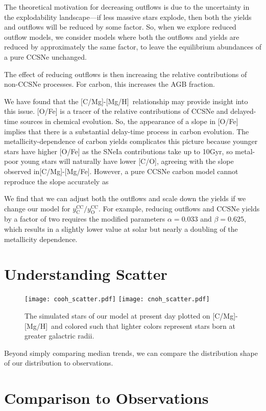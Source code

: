 \documentclass[12pt,oneside]{report}
\newcommand{\caah}{[C/Mg]-[Mg/H]}
\newcommand{\caafe}{[C/Mg]-[Mg/Fe]}
\begin{document}
The theoretical motivation for decreasing outflows is due to the uncertainty in the explodability landscape---if less massive stars explode, then both the yields and outflows will be reduced by some factor. So, when we explore reduced outflow models, we consider models where both the outflows and yields are reduced by approximately the same factor, to leave the equilibrium abundances of a pure CCSNe unchanged. 

The effect of reducing outflows is then increasing the relative contributions of non-CCSNe processes. For carbon, this increases the AGB fraction.

We have found that the \caah~relationship may provide insight into this issue. [O/Fe] is a tracer of the relative contributions of CCSNe and delayed-time sources in chemical evolution. So, the appearance of a slope in [O/Fe] implies that there is a substantial delay-time process in carbon evolution. 
The metallicity-dependence of carbon yields complicates this picture because
younger stars have higher [O/Fe] as the SNeIa contributions take up to 10Gyr,
so metal-poor young stars will naturally have lower [C/O], agreeing with the
slope observed in\caafe. However, a pure CCSNe carbon model cannot reproduce the slope accurately as  


We find that we can adjust both the outflows and scale down the yields if we change our model for $y_\text{C}^\text{CC}/y_\text{O}^\text{CC}$. For example, reducing outflows and CCSNe yields by a factor of two requires the modified parameters
$\alpha = 0.033$ and $\beta = 0.625$, which results in a slightly lower value at solar but nearly a doubling of the metallicity dependence.

\section{Understanding Scatter}

\begin{figure}
    \texttt{[image: cooh\_scatter.pdf]}
    \texttt{[image: cnoh\_scatter.pdf]}
    \caption[Scatter agreement]{The simulated stars of our model at present day plotted on \caah~and colored such that lighter colors represent stars born at greater galactric radii.}
\end{figure}

Beyond simply comparing median trends, we can compare the distribution 
shape of our distribution to observations. 

\section{Comparison to Observations}
\end{document}
